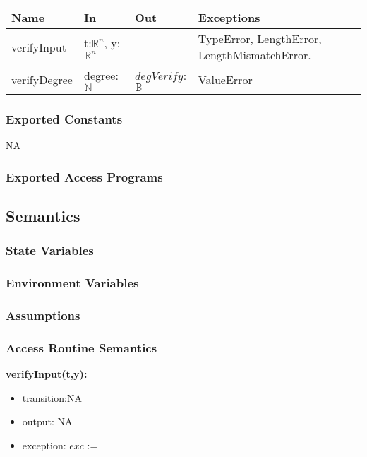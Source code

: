 \documentclass[12pt, titlepage]{article}
\begin{document}
\begin{tabular}{p{3cm} p{3cm} p{4cm} >{\raggedright\arraybackslash}p{6cm}}
	\toprule
	\textbf{Name} & \textbf{In} & \textbf{Out} & \textbf{Exceptions} \\
	\midrule
	verifyInput & t:$\mathbb{R}^n$, y:$\mathbb{R}^n$ & - & TypeError, 
	LengthError, LengthMismatchError.  \\
	verifyDegree & degree:$\mathbb{N}$ & $degVerify$:$\mathbb{B}$ & ValueError\\
	\bottomrule
\end{tabular}

\subsubsection{Exported Constants}

NA

\subsubsection{Exported Access Programs} 

\subsection{Semantics}

\subsubsection{State Variables}

\subsubsection{Environment Variables} 

\subsubsection{Assumptions}

\subsubsection{Access Routine Semantics}

\noindent \textbf{verifyInput(t,y):}
\begin{itemize}
\item transition:NA
\item output: NA
\item exception: $exc$ := 
\end{itemize}
\end{document}
